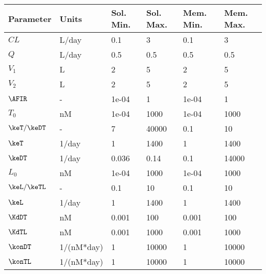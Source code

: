 \begin{tabular}{llllll}
  \hline
Parameter & Units & Sol. Min. & Sol. Max. & Mem. Min. & Mem. Max. \\ 
  \hline
$CL$ & L/day & 0.1 & 3 & 0.1 & 3 \\ 
  $Q$ & L/day & 0.5 & 0.5 & 0.5 & 0.5 \\ 
  $V_1$ & L & 2 & 5 & 2 & 5 \\ 
  $V_2$ & L & 2 & 5 & 2 & 5 \\ 
  $\AFIR$ & - & 1e-04 & 1 & 1e-04 & 1 \\ 
  $T_0$ & nM & 1e-04 & 1000 & 1e-04 & 1000 \\ 
  $\keT/\keDT$ & - & 7 & 40000 & 0.1 & 10 \\ 
  $\keT$ & 1/day & 1 & 1400 & 1 & 1400 \\ 
  $\keDT$ & 1/day & 0.036 & 0.14 & 0.1 & 14000 \\ 
  $L_0$ & nM & 1e-04 & 1000 & 1e-04 & 1000 \\ 
  $\keL/\keTL$ & - & 0.1 & 10 & 0.1 & 10 \\ 
  $\keL$ & 1/day & 1 & 1400 & 1 & 1400 \\ 
  $\KdDT$ & nM & 0.001 & 100 & 0.001 & 100 \\ 
  $\KdTL$ & nM & 0.001 & 1000 & 0.001 & 1000 \\ 
  $\konDT$ & 1/(nM*day) & 1 & 10000 & 1 & 10000 \\ 
  $\konTL$ & 1/(nM*day) & 1 & 10000 & 1 & 10000 \\ 
   \hline
\end{tabular}
